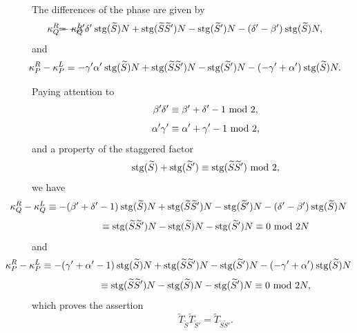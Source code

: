 \documentclass[12pt]{iopart}
\begin{document}
The differences of the phase are given by
\begin{equation}
\hspace{-15mm}
\kappa^R_Q-\kappa^L_Q
\hspace{-10mm}
=-\beta'\delta'\:{\rm stg}(\widetilde S)N
+{\rm stg}(\widetilde S\widetilde S')N
-{\rm stg}(\widetilde S')N
-(\delta'-\beta')\:{\rm stg}(\widetilde S)N,
\end{equation}
and
\begin{equation}
\hspace{-15mm}
\kappa^R_P-\kappa^L_P
=-\gamma'\alpha'\:{\rm stg}(\widetilde S)N
+{\rm stg}(\widetilde S\widetilde S')N
-{\rm stg}(\widetilde S')N
-(-\gamma'+\alpha')\:{\rm stg}(\widetilde S)N.
\end{equation}

Paying attention to
\begin{equation}
\beta'\delta'\equiv\beta'+\delta'-1\ {\rm mod}\ 2,
\end{equation}
\begin{equation}
\alpha'\gamma'\equiv \alpha'+\gamma'-1\ {\rm mod}\ 2,
\end{equation}
and a property of the staggered factor
\begin{equation}
{\rm stg}(\widetilde S)
+
{\rm stg}(\widetilde S')
\equiv
{\rm stg}(\widetilde S\widetilde S')\ {\rm mod}\ 2,
\end{equation}
we have
\[
\hspace{-20mm}
\kappa^R_Q-\kappa^L_Q
\equiv
-(\beta'+\delta'-1)\:{\rm stg}(\widetilde S)N
+{\rm stg}(\widetilde S\widetilde S')N
-{\rm stg}(\widetilde S')N
-(\delta'-\beta')\:{\rm stg}(\widetilde S)N
\]
\begin{equation}
\equiv
{\rm stg}(\widetilde S\widetilde S')N
-
{\rm stg}(\widetilde S)N
-
{\rm stg}(\widetilde S')N
\equiv
0
\ {\rm mod}\ 2N
\end{equation}
and
\[
\hspace{-20mm}
\kappa^R_P-\kappa^L_P
\equiv
-(\gamma'+\alpha'-1)\:{\rm stg}(\widetilde S)N
+{\rm stg}(\widetilde S\widetilde S')N
-{\rm stg}(\widetilde S')N
-(-\gamma'+\alpha')\:{\rm stg}(\widetilde S)N
\]
\begin{equation}
\equiv
{\rm stg}(\widetilde S\widetilde S')N
-
{\rm stg}(\widetilde S)N
-
{\rm stg}(\widetilde S')N
\equiv
0
\ {\rm mod}\ 2N,
\end{equation}
which proves the assertion
\begin{equation}
\widetilde T_{\widetilde S}\widetilde T_{\widetilde S'}
=
\widetilde T_{\widetilde S\widetilde S'}.
\end{equation}
\ \\
\end{document}
